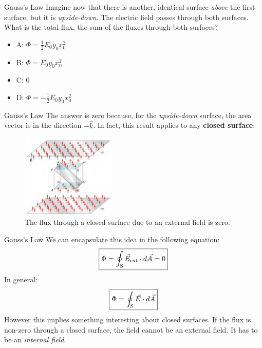 \documentclass{beamer}
\begin{document}
\begin{frame}{Gauss's Law}
Imagine now that there is another, identical surface \textit{above} the first surface, but it is \textit{upside-down}.  The electric field passes through both surfaces.  What is the total flux, the sum of the fluxes through both surfaces?
\begin{itemize}
\item A: $\Phi = \frac{1}{2} E_0 y_0 x_0^2$
\item B: $\Phi = E_0 y_0 x_0^2$
\item C: $0$
\item D: $\Phi = -\frac{1}{2} E_0 y_0 x_0^2$
\end{itemize}
\end{frame}

\begin{frame}{Gauss's Law}
The answer is zero because, for the \textit{upside-down} surface, the area vector is in the direction $-\hat{k}$.  In fact, this result applies to any \textbf{closed surface}:
\begin{figure}
\centering
\includegraphics[width=0.4\textwidth]{figures/cube.png}
\caption{\label{fig:cube} The flux through a closed surface due to an external field is zero.}
\end{figure}
\end{frame}

\begin{frame}{Gauss's Law}
We can encapsulate this idea in the following equation:
\begin{equation}
\boxed{
\Phi = \oint_{\rm S} \vec{E}_{\rm ext} \cdot d\vec{A} = 0} \label{eq:ext}
\end{equation}
In general:
\begin{equation}
\boxed{
\Phi = \oint_{\rm S} \vec{E} \cdot d\vec{A}} \label{eq:general}
\end{equation}
However this implies something interesting about closed surfaces.  If the flux is non-zero through a closed surface, the field cannot be an external field.  It has to be an \textit{internal field}.
\end{frame}
\end{document}
